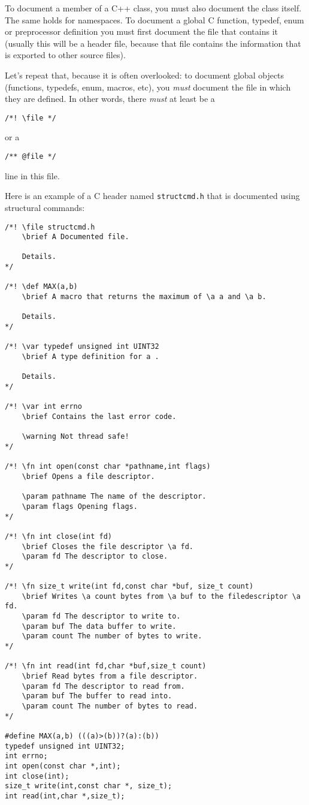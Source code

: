 To document a member of a C++ class, you must also document the class itself. The same holds for namespaces. To document a global C function, typedef, enum or preprocessor definition you must first document the file that contains it (usually this will be a header file, because that file contains the information that is exported to other source files).

Let's repeat that, because it is often overlooked: to document global objects (functions, typedefs, enum, macros, etc), you {\em must\/} document the file in which they are defined. In other words, there {\em must\/} at least be a 

\footnotesize\begin{verbatim}/*! \file */ \end{verbatim}
\normalsize
 or a 

\footnotesize\begin{verbatim}/** @file */ \end{verbatim}
\normalsize
 line in this file.

Here is an example of a C header named {\tt structcmd.h} that is documented using structural commands: 

\begin{DocInclude}\begin{verbatim}/*! \file structcmd.h
    \brief A Documented file.
    
    Details.
*/

/*! \def MAX(a,b)
    \brief A macro that returns the maximum of \a a and \a b.
   
    Details.
*/

/*! \var typedef unsigned int UINT32
    \brief A type definition for a .
    
    Details.
*/

/*! \var int errno
    \brief Contains the last error code.

    \warning Not thread safe!
*/

/*! \fn int open(const char *pathname,int flags)
    \brief Opens a file descriptor.

    \param pathname The name of the descriptor.
    \param flags Opening flags.
*/

/*! \fn int close(int fd)
    \brief Closes the file descriptor \a fd.
    \param fd The descriptor to close.
*/

/*! \fn size_t write(int fd,const char *buf, size_t count)
    \brief Writes \a count bytes from \a buf to the filedescriptor \a fd.
    \param fd The descriptor to write to.
    \param buf The data buffer to write.
    \param count The number of bytes to write.
*/

/*! \fn int read(int fd,char *buf,size_t count)
    \brief Read bytes from a file descriptor.
    \param fd The descriptor to read from.
    \param buf The buffer to read into.
    \param count The number of bytes to read.
*/

#define MAX(a,b) (((a)>(b))?(a):(b))
typedef unsigned int UINT32;
int errno;
int open(const char *,int);
int close(int);
size_t write(int,const char *, size_t);
int read(int,char *,size_t);
\end{verbatim}
\end{DocInclude}
 

